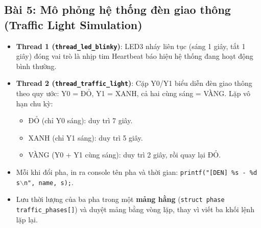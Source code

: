 \newpage
\subsection{Bài 5: Mô phỏng hệ thống đèn giao thông (Traffic Light Simulation)}

\begin{tcolorbox}[
    enhanced,
    colback=black!2,
    colframe=black!60,
    boxrule=1pt,
    arc=2.5mm,
    drop shadow,
    attach boxed title to top left={xshift=4mm, yshift=-3mm},
    boxed title style={
        enhanced,
        colback=black!85,
        colframe=black!85,
        boxrule=1pt,
        arc=2.5mm,
        drop shadow,
        left=6pt, right=6pt, top=2pt, bottom=2pt
    },
    title=\textcolor{white}{\large\textbf{Yêu cầu đề bài (Trích phiếu bài tập)}}
]
\bfseries
\vspace{0.2cm}
\begin{itemize}
    \item \textbf{Thread 1 (\texttt{thread\_led\_blinky})}: LED3 nháy liên tục (sáng 1 giây, tắt 1 giây) đóng vai trò là nhịp tim Heartbeat báo hiệu hệ thống đang hoạt động bình thường.
    \item \textbf{Thread 2 (\texttt{thread\_traffic\_light})}: Cặp Y0/Y1 biểu diễn đèn giao thông theo quy ước: Y0 = ĐỎ, Y1 = XANH, cả hai cùng sáng = VÀNG. Lặp vô hạn chu kỳ:
    \begin{itemize}
        \item ĐỎ (chỉ Y0 sáng): duy trì 7 giây.
        \item XANH (chỉ Y1 sáng): duy trì 5 giây.
        \item VÀNG (Y0 + Y1 cùng sáng): duy trì 2 giây, rồi quay lại ĐỎ.
    \end{itemize}
    \item Mỗi khi đổi pha, in ra console tên pha và thời gian: \texttt{printf("[DEN] \%s - \%d s$\backslash$n", name, s);}.
    \item Lưu thời lượng của ba pha trong một \textbf{mảng hằng} (\texttt{struct phase traffic\_phases[]}) và duyệt mảng bằng vòng lặp, thay vì viết ba khối lệnh lặp lại.
\end{itemize}
\end{tcolorbox}

\vspace{0.3cm}
